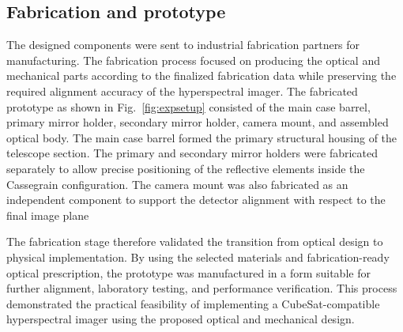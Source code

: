 \documentclass{iac}
\begin{document}
\subsection{Fabrication and prototype}
The designed components were sent to industrial fabrication partners for manufacturing. The fabrication process focused on producing the optical and mechanical parts according to the finalized fabrication data while preserving the required alignment accuracy of the hyperspectral imager.
The fabricated prototype as shown in Fig.~\ref{fig:expsetup} consisted of the main case barrel, primary mirror holder, secondary mirror holder, camera mount, and assembled optical body. The main case barrel formed the primary structural housing of the telescope section. The primary and secondary mirror holders were fabricated separately to allow precise positioning of the reflective elements inside the Cassegrain configuration. The camera mount was also fabricated as an independent component to support the detector alignment with respect to the final image plane

The fabrication stage therefore validated the transition from optical design to physical implementation. By using the selected materials and fabrication-ready optical prescription, the prototype was manufactured in a form suitable for further alignment, laboratory testing, and performance verification. This process demonstrated the practical feasibility of implementing a CubeSat-compatible hyperspectral imager using the proposed optical and mechanical design.
\end{document}
